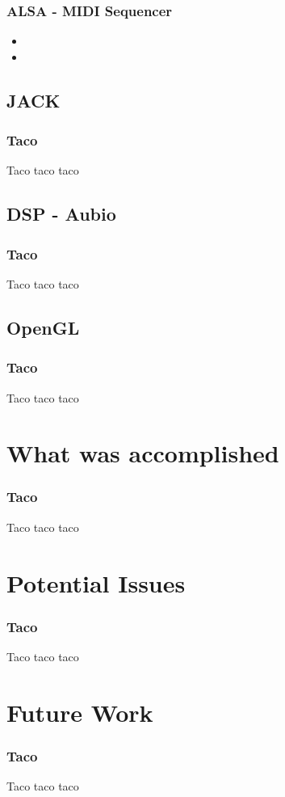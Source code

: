 \documentclass[english]{beamer}
\begin{document}
\begin{frame}
  \frametitle{ALSA - MIDI Sequencer}
  \begin{itemize}
    \item {}
    \item {}
  \end{itemize}
\end{frame}

\subsection{JACK}

\begin{frame}
  \frametitle{Taco}
  Taco taco taco
\end{frame}

\subsection{DSP - Aubio}

\begin{frame}
  \frametitle{Taco}
  Taco taco taco
\end{frame}

\subsection{OpenGL}

\begin{frame}
  \frametitle{Taco}
  Taco taco taco
\end{frame}

\section{What was accomplished}

\begin{frame}
  \frametitle{Taco}
  Taco taco taco
\end{frame}

\section{Potential Issues}

\begin{frame}
  \frametitle{Taco}
  Taco taco taco
\end{frame}

\section{Future Work}

\begin{frame}
  \frametitle{Taco}
  Taco taco taco
\end{frame}
\end{document}

